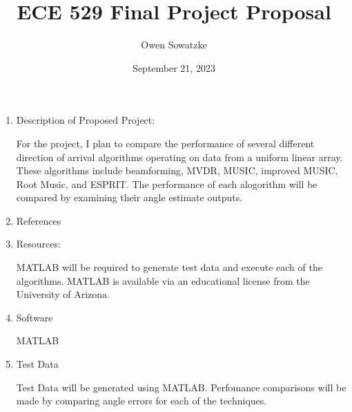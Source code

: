 \documentclass{article}
\title{ECE 529 Final Project Proposal}
\author{Owen Sowatzke}
\date{September 21, 2023}
\begin{document}
	\maketitle
	
	\begin{enumerate}
		\item Description of Proposed Project:
		
			For the project, I plan to compare the performance of several different direction of arrival algorithms operating on data from a uniform linear array. These algorithms include beamforming, MVDR, MUSIC, improved MUSIC, Root Music, and ESPRIT. The performance of each alogorithm will be compared by examining their angle estimate outputs.
			
		\item References
		
		\item Resources:
		
			MATLAB will be required to generate test data and execute each of the algorithms. MATLAB is available via an educational license from the University of Arizona.
			
		\item Software
		
			MATLAB
		
		\item Test Data	
			
			Test Data will be generated using MATLAB. Perfomance comparisons will be made by comparing angle errors for each of the techniques. 
	\end{enumerate}	 
\end{document}
